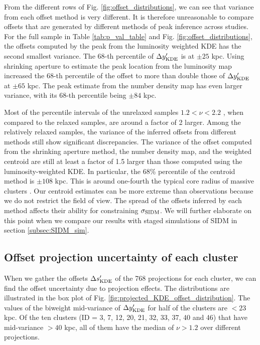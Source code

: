 From the different rows of Fig. \ref{fig:offset_distributions}, we can see 
that variance from each offset method is very different.
It is therefore unreasonable to compare offsets that are generated 
by different methods of peak inference across studies.
For the full sample in Table \ref{tab:p_val_table} and Fig. 
\ref{fig:offset_distributions},
the offsets computed by the peak from the luminosity weighted KDE 
has the second smallest variance. The 68-th percentile of $\Delta y_{\rm
KDE}'$ is at $\pm 25$ kpc. Using shrinking aperture to estimate
the peak location from the luminosity map increased the 68-th percentile of the
offset to more than double those of $\Delta y_{\rm KDE}'$ at $\pm 65$ kpc.
The peak estimate from the number density map has even larger variance, 
with its 68-th percentile being $\pm 84$ kpc. 

Most of the percentile intervals of the unrelaxed samples $ 1.2 < \nu < 2.2$ , 
when compared to the relaxed samples, are around a factor of 2 larger. 
Among the relatively relaxed samples, the variance of the inferred offsets from different
methods still show significant discrepancies. 
The variance of the offset computed from the shrinking aperture method, 
the number density map, and the weighted centroid are still at least a factor of 1.5
larger than those computed using the luminosity-weighted KDE. 
In particular, the 68\% percentile of the centroid method is $\pm 108$ kpc.
This is around one-fourth the typical core radius of massive clusters
\citep{Allen1998}. Our centroid estimates can be more extreme than observations
because we do not restrict the field of view.
The spread of the offsets inferred by each method affects their ability
for constraining $\sigma_{\rm SIDM}$. We will further elaborate on this point
when we compare our results with staged simulations of SIDM in section
\ref{subsec:SIDM_sim}. 


\subsection{Offset projection uncertainty of each cluster}
\label{subsec:projections}
When we gather the offsets $\Delta s_{\rm KDE}'$ of the 
768 projections for each cluster,
we can find the offset uncertainty due to projection effects.
The distributions are illustrated in the box plot of Fig. 
\ref{fig:projected_KDE_offset_distribution}. The values of the biweight 
mid-variance of $\Delta y_{\rm KDE}'$ for half of the clusters
are $< 23$ kpc. Of the ten clusters (ID = 3, 7, 12, 20, 21, 32, 33, 37, 40 and 46) 
that have mid-variance $ > 40$ kpc, all of them have the median of $\nu > 1.2$
over different projections.
 

